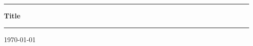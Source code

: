 \thispagestyle{empty}

\hrule
\vspace{0.5cm}
\begin{center}
    {\huge \bfseries Title}
    \vspace{0.5cm}
    \hrule
    \vspace{0.4cm}
    \today
\end{center}
\newpage